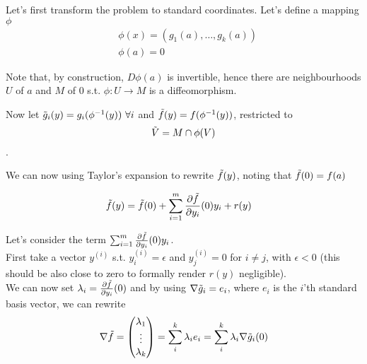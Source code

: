 \begin{homeworkProblem}

Let's first transform the problem to standard coordinates. Let's define a mapping $\phi$
\begin{equation}
    \begin{split}
        & \phi(x) = (g_1(a), \dots, g_k(a)) \\
        & \phi(a) = 0
      \end{split}
\end{equation}

Note that, by construction, $D\phi(a)$ is invertible, hence there are neighbourhoods $U$ of $a$ and $M$ of 0 s.t. $\phi: U \xrightarrow{} M$ is a diffeomorphism.

Now let $\Tilde{g}_i(y) = g_i(\phi^{-1}(y)) \ \forall i$ and $\Tilde{f}(y) = f(\phi^{-1}(y))$, restricted to
\begin{equation}
    \Tilde{V} = M \cap \phi(V)
\end{equation}.

We can now using Taylor's expansion to rewrite $\Tilde{f}(y)$, noting that $\Tilde{f}(0) = f(a)$

\begin{equation} \label{taylor}
    \begin{split}
        \Tilde{f}(y) &= \Tilde{f}(0) + \sum_{i=1}^m \frac{\partial \Tilde{f}}{\partial y_i}(0) y_i + r(y)
    \end{split}
\end{equation}

Let's consider the term $ \sum_{i=1}^m \frac{\partial \Tilde{f}}{\partial y_i}(0) y_i$. \\
First take a vector $y^{(i)}$ s.t. $y^{(i)}_i = \epsilon$ and $y^{(i)}_j = 0$ for $i \neq j$, with $\epsilon < 0$ (this should be also close to zero to formally render $r(y)$ negligible). \\
We can now set $\lambda_i = \frac{\partial \Tilde{f}}{\partial y_i}(0)$ and by using $\nabla \Tilde{g}_i = e_i$, where $e_i$ is the $i$'th standard basis vector, we can rewrite
\begin{equation}
    \nabla \Tilde{f} = \begin{pmatrix} 
        \lambda_1\\ \vdots \\ \lambda_k
    \end{pmatrix} = \sum_{i}^k \lambda_i e_i = \sum_{i}^k \lambda_i \nabla \Tilde{g}_i(0)
\end{equation}


\end{homeworkProblem}
